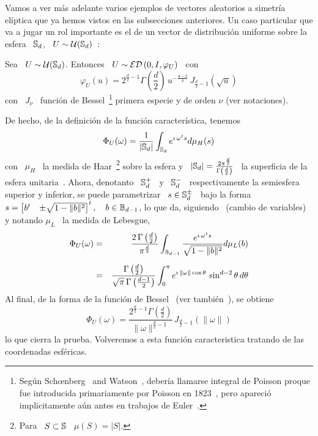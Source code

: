 Vamos a ver  m\'as adelante varios ejemplos de  vectores aleatorios a simetr\'ia
el\'iptica  que  ya  hemos  vistos  en las  subsecciones  anteriores.   Un  caso
particular que va a jugar un rol importante es el de un vector de distribuci\'on
uniforme sobre la esfera \ $\mathbb{S}_d$, \ $U \sim \mathcal{U}(\mathbb{S}_d)$~\cite{FanKot90}:
%
\begin{ejemplo}\label{Ej:MP:GeneCaracUniformeEsfera}
%
  Sea \  $U \sim \mathcal{U}(\mathbb{S}_d)$. Entonces  \ $U \sim  \mathcal{ED}\left( 0 , I  , \varphi_U
  \right)$ \ con
  \[
  \varphi_U(u)   =  2^{\frac{d}{2}-1}   \Gamma\left(   \frac{d}{2}  \right)   \,
  u^{-\frac{d-2}{4}} \, J_{\frac{d}{2}-1}\left( \sqrt{u} \right)
  \]
  con \ $J_\nu$ \ funci\'on de Bessel~\footnote{Seg\'un Sch{\oe}nberg~\cite[Nota
    de  pie~9]{Sch38} and Watson~\cite[p.~24,  nota de  pie~*]{Wat22}, deber\'ia
    llamarse  integral  de  Poisson  proque fue  introducida  primariamente  por
    Poisson en 1823~\cite{Poi23}, pero  apareci\'o implicitamente a\'un antes en
    trabajos  de Euler~\cite[Cap.~X, \S~1036]{Eul1769}.}   primera especie  y de
  orden $\nu$ (ver notaciones).
  
  De hecho, de la definici\'on de la funci\'on caracter\'istica, tenemos
  \[
  \Phi_U(\omega) =  \frac{1}{|\mathbb{S}_d|} \int_{\mathbb{S}_d} e^{\imath  \, \omega^t s}
  d\mu_H(s)
  \]
  con \ $\mu_H$ \ la medida de Haar~\footnote{Para \ $S \subset \mathbb{S}$ \ $\mu(S)
    =    |S|$.}     sobre    la    esfera    y   \    $|\mathbb{S}_d|    =    \frac{2
    \pi^{\frac{d}{2}}}{\Gamma\left( \frac{d}{2} \right)}$  \ la superficia de la
  esfera  unitaria~\cite{GraRyz15}.   Ahora,  denotanto  \  $\mathbb{S}_d^+$  \  y  \
  $\mathbb{S}_d^-$  \ respectivamente  la semiesfera  superior y  inferior,  se puede
  parametrizar \  $s \in \mathbb{S}_d^{\pm}$ \  bajo la forma \  $s = \begin{bmatrix}
    b^t & \pm \sqrt{1-\|b\|^2} \end{bmatrix}^t, \quad b \in \mathbb{B}_{d-1}$, lo que
  da,  siguiendo~\cite[ec.~4.644]{GraRyz15}  (cambio  de  variables)  y  notando
  $\mu_L$ \ la medida de Lebesgue,
  \begin{eqnarray*}
  \Phi_U(\omega) & = & \frac{2 \, \Gamma\left( \frac{d}{2}
  \right)}{\pi^{\frac{d}{2}}} \int_{\mathbb{B}_{d-1}} \frac{e^{\imath \, \omega^t
  s}}{\sqrt{1-\|b\|^2}} d\mu_L(b)\\[2mm]
  & = & \frac{\Gamma\left( \frac{d}{2} \right)}{\sqrt{\pi} \, \Gamma\left(
  \frac{d-1}{2} \right)} \int_0^{\pi} e^{\imath \, \| \omega \| \cos\theta} \,
  \sin^{d-2}\theta \, d\theta
  \end{eqnarray*}
  Al final,  de la forma de la  funci\'on de Bessel~\cite[Ec.~8.411-7]{GraRyz15}
  (ver tambi\'en~\cite{AbrSte70, Wat22, GraMat95}), se obtiene
  \[
  \Phi_U(\omega) =  \frac{2^{\frac{d}{2}-1} \Gamma\left( \frac{d}{2} \right)}{\|
    \omega \|^{\frac{d}{2}-1}} \, J_{\frac{d}{2}-1}\left( \|\omega\| \right)
  \]
  lo que cierra  la prueba. Volveremos a esta  funci\'on caracteristica tratando
  de las coordenadas esf\'ericas.
\end{ejemplo}

